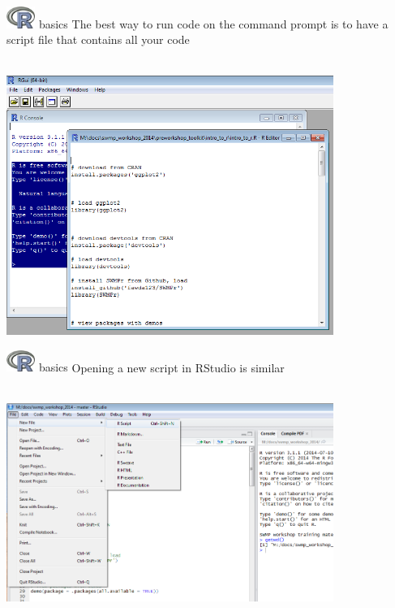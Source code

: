 \documentclass[xcolor=svgnames]{beamer}\usepackage[]{graphicx}\usepackage[]{color}
\begin{document}
\begin{frame}[fragile]{\includegraphics[width=0.07\textwidth]{Rlogo.jpg} \hspace{0.01in} basics}
The best way to run code on the command prompt is to have a script file that contains all your code \\~\\
\centerline{\includegraphics[width = 0.8\textwidth]{openscript2.png}}
\end{frame}

\begin{frame}[fragile]{\includegraphics[width=0.07\textwidth]{Rlogo.jpg} \hspace{0.01in} basics}
Opening a new script in RStudio is similar \\~\\
\centerline{\includegraphics[width = 0.8\textwidth]{rstudio_script.png}}
\end{frame}
\end{document}
